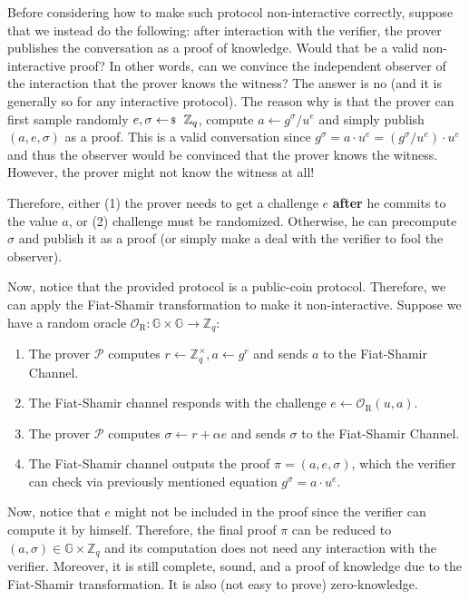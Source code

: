\documentclass[../../book.tex]{subfiles}
\begin{document}
\vspace{10px}

\begin{remark}
    Before considering how to make such protocol non-interactive correctly, suppose that we instead do the following: after interaction with the verifier, the prover publishes the conversation as a proof of knowledge. Would that be a valid non-interactive proof? In other words, can we convince the independent observer of the interaction that the prover knows the witness? The answer is no (and it is generally so for any interactive protocol). The reason why is that the prover can first sample randomly $e,\sigma \leftarrowS \mathbb{Z}_q$, compute $a \gets g^{\sigma}/u^e$ and simply publish $(a,e,\sigma)$ as a proof. This is a valid conversation since $g^{\sigma} = a \cdot u^{e} = (g^{\sigma}/u^e) \cdot u^e$ and thus the observer would be convinced that the prover knows the witness. However, the prover might not know the witness at all!

    Therefore, either (1) the prover needs to get a challenge $e$ \textbf{after} he commits to the value $a$, or (2) challenge must be randomized. Otherwise, he can precompute $\sigma$ and publish it as a proof (or simply make a deal with the verifier to fool the observer). 
\end{remark}

Now, notice that the provided protocol is a public-coin protocol. Therefore, we can apply the Fiat-Shamir transformation to make it non-interactive. Suppose we have a random oracle $\mathcal{O}_{\text{R}}: \mathbb{G} \times \mathbb{G} \to \mathbb{Z}_q$:
\begin{enumerate}
    \item The prover $\mathcal{P}$ computes $r \gets \mathbb{Z}_q^{\times}, a \gets g^{r}$ and sends $a$ to the Fiat-Shamir Channel.
    \item The Fiat-Shamir channel responds with the challenge $e \gets \mathcal{O}_{\text{R}}(u,a)$.
    \item The prover $\mathcal{P}$ computes $\sigma \gets r + \alpha e$ and sends $\sigma$ to the Fiat-Shamir Channel.
    \item The Fiat-Shamir channel outputs the proof $\pi = (a,e,\sigma)$, which the verifier can check via previously mentioned equation $g^{\sigma} = a \cdot u^e$.
\end{enumerate}

Now, notice that $e$ might not be included in the proof since the verifier can compute it by himself. Therefore, the final proof $\pi$ can be reduced to $(a,\sigma) \in \mathbb{G} \times \mathbb{Z}_q$ and its computation does not need any interaction with the verifier. Moreover, it is still complete, sound, and a proof of knowledge due to the Fiat-Shamir transformation. It is also (not easy to prove) zero-knowledge.
\end{document}
